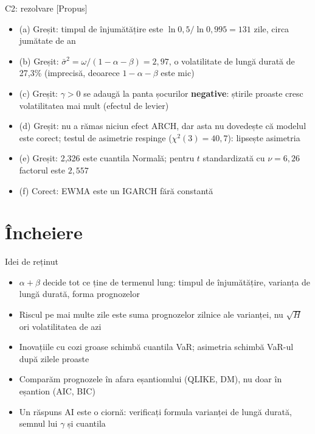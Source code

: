 \ifsolutions
\begin{frame}{C2: rezolvare [Propus]}
\itemsize{\footnotesize}
\begin{itemize}
    \item (a) Greșit: timpul de înjumătățire este $\ln 0{,}5/\ln 0{,}995 = 131$ zile, circa jumătate de an
    \item (b) Greșit: $\bar\sigma^2 = \omega/(1 - \alpha - \beta) = 2{,}97$, o volatilitate de lungă durată de 27{,}3\% (imprecisă, deoarece $1 - \alpha - \beta$ este mic)
    \item (c) Greșit: $\gamma > 0$ se adaugă la panta șocurilor \textbf{negative}: știrile proaste cresc volatilitatea mai mult (efectul de levier)
    \item (d) Greșit: nu a rămas niciun efect ARCH, dar asta nu dovedește că modelul este corect; testul de asimetrie respinge ($\chi^2(3) = 40{,}7$): lipsește asimetria
    \item (e) Greșit: 2,326 este cuantila Normală; pentru $t$ standardizată cu $\nu = 6{,}26$ factorul este $2{,}557$
    \item (f) Corect: EWMA este un IGARCH fără constantă
\end{itemize}
\end{frame}
\fi


\section{Încheiere}

\begin{frame}{Idei de reținut}
\itemsize{\small}
\begin{itemize}
    \item $\alpha + \beta$ decide tot ce ține de termenul lung: timpul de înjumătățire, varianța de lungă durată, forma prognozelor
    \item Riscul pe mai multe zile este suma prognozelor zilnice ale varianței, nu $\sqrt{H}$ ori volatilitatea de azi
    \item Inovațiile cu cozi groase schimbă cuantila VaR; asimetria schimbă VaR-ul după zilele proaste
    \item Comparăm prognozele în afara eșantionului (QLIKE, DM), nu doar în eșantion (AIC, BIC)
    \item Un răspuns AI este o ciornă: verificați formula varianței de lungă durată, semnul lui $\gamma$ și cuantila
\end{itemize}
\end{frame}

